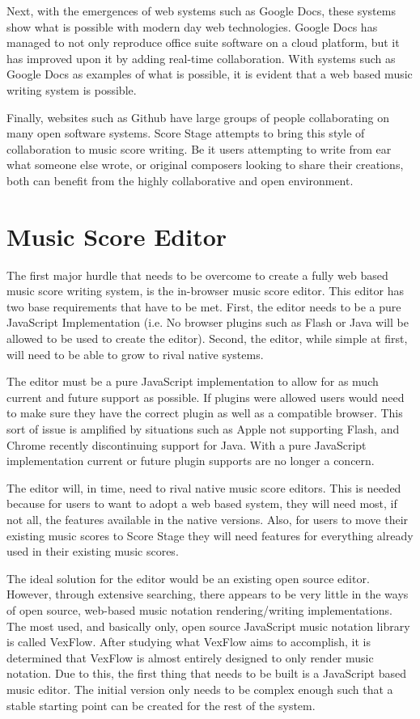 \documentclass[letterpaper,12pt]{article}
\begin{document}
Next, with the emergences of web systems such as Google Docs, these systems show what is possible with modern day web
technologies. Google Docs has managed to not only reproduce office suite software on a cloud platform, but it has
improved upon it by adding real-time collaboration. With systems such as Google Docs as examples of what is possible,
it is evident that a web based music writing system is possible.

Finally, websites such as Github have large groups of people collaborating on many open software systems. Score Stage
attempts to bring this style of collaboration to music score writing. Be it users attempting to write from ear what
someone else wrote, or original composers looking to share their creations, both can benefit from the highly
collaborative and open environment.

\section{Music Score Editor}

The first major hurdle that needs to be overcome to create a fully web based music score writing system, is the
in-browser music score editor. This editor has two base requirements that have to be met. First, the editor
needs to be a pure JavaScript Implementation (i.e. No browser plugins such as Flash or Java will be allowed to be used
to create the editor). Second, the editor, while simple at first, will need to be able to grow to rival native systems.

The editor must be a pure JavaScript implementation to allow for as much current and future support as possible. If
plugins were allowed users would need to make sure they have the correct plugin as well as a compatible browser.
This sort of issue is amplified by situations such as Apple not supporting Flash, and Chrome recently discontinuing
support for Java. With a pure JavaScript implementation current or future plugin supports are no longer a concern.

The editor will, in time, need to rival native music score editors. This is needed because for users to want to adopt
a web based system, they will need most, if not all, the features available in the native versions. Also, for users to
move their existing music scores to Score Stage they will need features for everything already used in their existing
music scores.

The ideal solution for the editor would be an existing open source editor. However, through extensive searching, there
appears to be very little in the ways of open source, web-based music notation rendering/writing implementations. The
most used, and basically only, open source JavaScript music notation library is called VexFlow. After studying what
VexFlow aims to accomplish, it is determined that VexFlow is almost entirely designed to only render music notation. Due
to this, the first thing that needs to be built is a JavaScript based music editor. The initial version only needs to be
complex enough such that a stable starting point can be created for the rest of the system.
\end{document}
